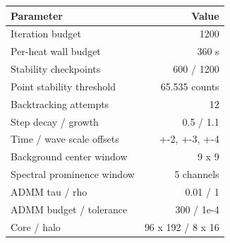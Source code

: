 \begingroup
{}
\begin{tabular}{lr}
\toprule
Parameter & Value \\
\midrule
Iteration budget & 1200 \\
Per-heat wall budget & 360 s \\
Stability checkpoints & 600 / 1200 \\
Point stability threshold & 65.535 counts \\
Backtracking attempts & 12 \\
Step decay / growth & 0.5 / 1.1 \\
Time / wave scale offsets & +-2, +-3, +-4 \\
Background center window & 9 x 9 \\
Spectral prominence window & 5 channels \\
ADMM tau / rho & 0.01 / 1 \\
ADMM budget / tolerance & 300 / 1e-4 \\
Core / halo & 96 x 192 / 8 x 16 \\
\bottomrule
\end{tabular}
\endgroup
